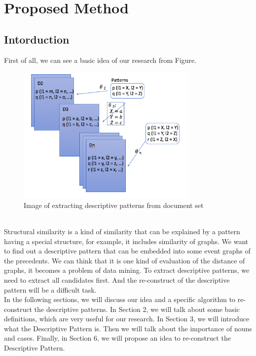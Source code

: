 \chapter{Proposed Method}
\section{Intorduction}
First of all, we can see a basic idea of our research from Figure. \\
\begin{figure}[!hbp]
\centering
\includegraphics[width=250pt]{./pictures/0301.png}
\caption{Image of extracting descriptive patterns from document set}
\end{figure}
\\
Structural similarity is a kind of similarity that can be explained by a pattern having a special structure, for example, it includes similarity of graphs. We want to find out a descriptive pattern that can be embedded into some event graphs of the precedents. We can think that it is one kind of evaluation of the distance of graphs, it becomes a problem of data mining. To extract descriptive patterns, we need to extract all candidates first. And the re-construct of the descriptive pattern will be a difficult task.\\
In the following sections, we will discuss our idea and a specific algorithm to re-construct the descriptive patterns. In Section 2, we will talk about some basic definitions, which are very useful for our research. In Section 3, we will introduce what the Descriptive Pattern is. Then we will talk about the importance of nouns and cases. Finally, in Section 6, we will propose an idea to re-construct the Descriptive Pattern.